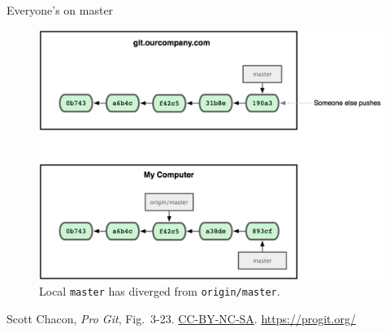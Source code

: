 \begin{frame}{Everyone's on master}
  \begin{figure}
    \includegraphics[scale=0.8]{18333fig0323-tn.png}
    \\ Local \texttt{master} has diverged from \texttt{origin/master}.
  \end{figure}
  \footnotesize{Scott Chacon,
    \emph{Pro Git},
    Fig.~3-23.
    \href{https://creativecommons.org/licenses/by-nc-sa/3.0/legalcode}{CC-BY-NC-SA}.
    \href{https://progit.org/}{https://progit.org/}}
\end{frame}

